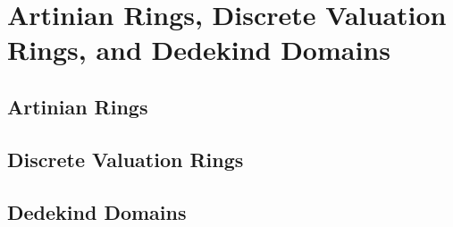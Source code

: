 \chapter{Artinian Rings, Discrete Valuation Rings, and Dedekind Domains}

\section{Artinian Rings}

\section{Discrete Valuation Rings}

\section{Dedekind Domains}